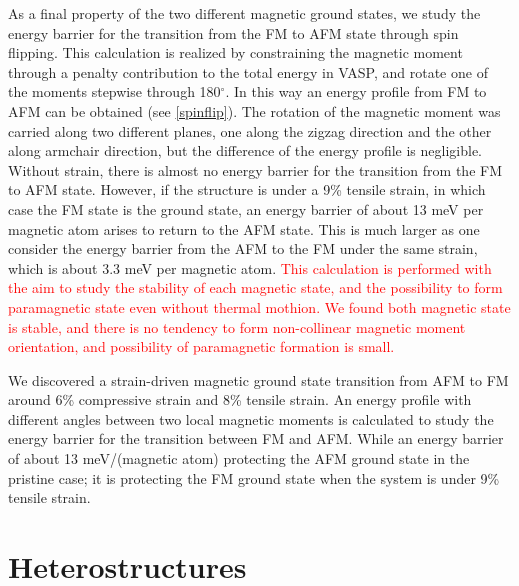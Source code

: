 As a final property of the two different magnetic ground states, we study the energy barrier for the transition from the FM to AFM state through spin flipping. This calculation is realized by constraining the magnetic moment through a penalty contribution to the total energy in VASP, and rotate one of the moments stepwise through 180$^{\circ}$.  In this way an energy profile from FM to AFM can be obtained (see \autoref{spinflip}). The rotation of the magnetic moment was carried along two different planes, one along the zigzag direction and the other along armchair direction, but the difference of the energy profile is negligible. Without strain, there is almost no energy barrier for the transition from the FM to AFM state. However, if the structure is under a 9\% tensile strain, in which case the FM state is the ground state, an energy barrier of about 13 meV per magnetic atom arises to return to the AFM state. This is much larger as one consider the energy barrier from the AFM to the FM under the same strain, which is about 3.3 meV per magnetic atom. \textcolor{red}{This calculation is performed with the aim to study the stability of each magnetic state, and the possibility to form paramagnetic state even without thermal mothion. We found both magnetic state is stable, and there is no tendency to form non-collinear magnetic moment orientation, and possibility of paramagnetic formation is small.}

We discovered a strain-driven magnetic ground state transition from AFM to FM around  6\% compressive strain and 8\% tensile strain. An energy profile with different angles between two local magnetic moments is calculated to study the energy barrier for the transition between FM and AFM. While an energy barrier of about 13 meV/(magnetic atom) protecting the AFM ground state in the pristine case; it is protecting the FM ground state when the system is under 9\% tensile strain.  

\section{Heterostructures}

